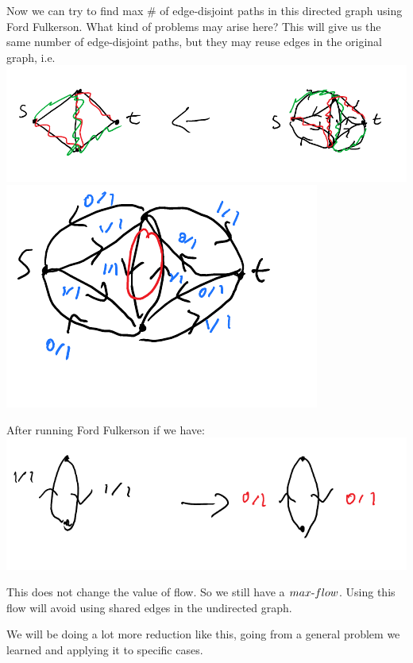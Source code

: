 \documentclass[12 pt]{article}
\begin{document}
        Now we can try to find max \# of edge-disjoint paths in this
        directed graph using Ford Fulkerson. What kind of problems may
        arise here? This will give us the same number of edge-disjoint
        paths, but they may reuse edges in the original graph, i.e.
        \\ \includegraphics[width=.9\textwidth]{i78.pdf}
        \\ \includegraphics[width=.9\textwidth]{i79.pdf}

        After running Ford Fulkerson if we have:
        \\ \includegraphics[width=.9\textwidth]{i80.pdf}
        
        This does not change the value of flow. So we still have a
        $max\hbox{-}flow$. Using this flow will avoid using shared
        edges in the undirected graph.

        We will be doing a lot more reduction like this, going from a
        general problem we learned and applying it to specific
        cases.
\end{document}
